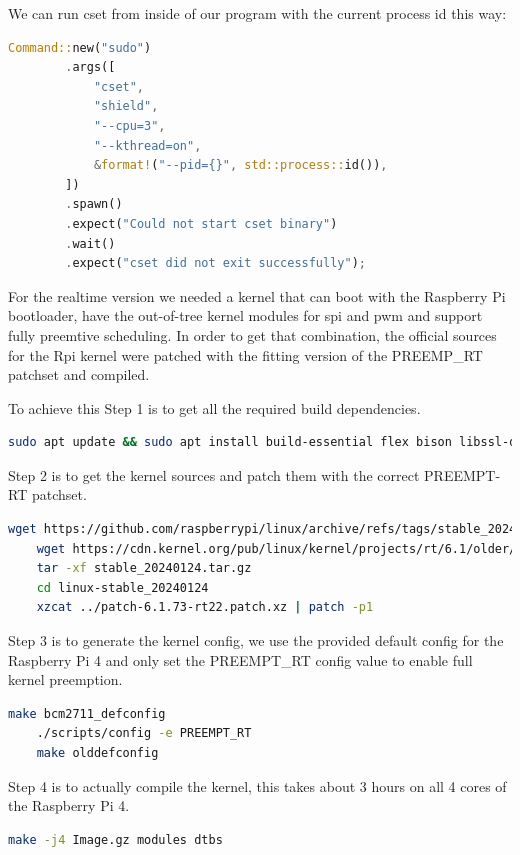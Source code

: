 We can run cset from inside of our program with the current process id this way:
\begin{lstlisting}[language=Rust,style=colouredRust]
    Command::new("sudo")
        .args([
            "cset",
            "shield",
            "--cpu=3",
            "--kthread=on",
            &format!("--pid={}", std::process::id()),
        ])
        .spawn()
        .expect("Could not start cset binary")
        .wait()
        .expect("cset did not exit successfully");
\end{lstlisting}

For the realtime version we needed a kernel that can boot with the Raspberry Pi bootloader,
have the out-of-tree kernel modules for spi and pwm and support fully preemtive scheduling.
In order to get that combination, the official sources for the Rpi kernel were patched with the fitting version of the PREEMP\_RT patchset and compiled.

To achieve this Step 1 is to get all the required build dependencies.
\begin{lstlisting}[language=bash, breaklines]
    sudo apt update && sudo apt install build-essential flex bison libssl-dev bc
\end{lstlisting}

Step 2 is to get the kernel sources and patch them with the correct PREEMPT-RT patchset.
\begin{lstlisting}[language=bash, breaklines]
    wget https://github.com/raspberrypi/linux/archive/refs/tags/stable_20240124.tar.gz
    wget https://cdn.kernel.org/pub/linux/kernel/projects/rt/6.1/older/patch-6.1.73-rt22.patch.xz
    tar -xf stable_20240124.tar.gz
    cd linux-stable_20240124
    xzcat ../patch-6.1.73-rt22.patch.xz | patch -p1
\end{lstlisting}

Step 3 is to generate the kernel config, we use the provided default config for the Raspberry Pi 4 and only set the PREEMPT\_RT config value to enable full kernel preemption.
\begin{lstlisting}[language=bash, breaklines]
    make bcm2711_defconfig
    ./scripts/config -e PREEMPT_RT
    make olddefconfig
\end{lstlisting}

Step 4 is to actually compile the kernel, this takes about 3 hours on all 4 cores of the Raspberry Pi 4.
\begin{lstlisting}[language=bash, breaklines]
    make -j4 Image.gz modules dtbs
\end{lstlisting}

